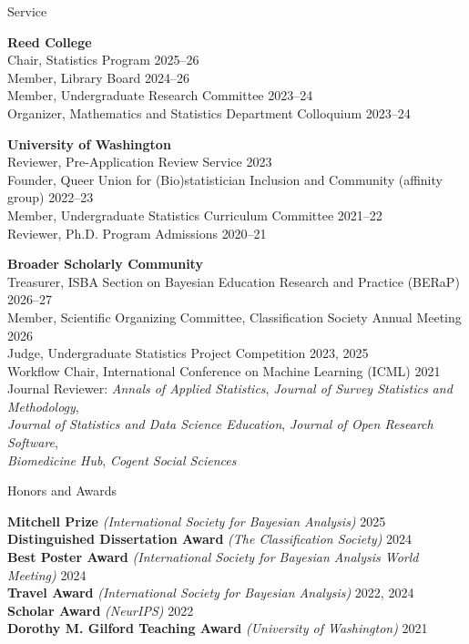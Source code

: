 \documentclass{resume} %
\begin{document}
\begin{rSection}{Service}

\textbf{Reed College}
\\ Chair, Statistics Program \hfill{2025--26}
\\ Member, Library Board \hfill{2024--26}
\\ Member, Undergraduate Research Committee \hfill{2023--24}
\\ Organizer, Mathematics and Statistics Department Colloquium \hfill{2023--24}

\textbf{University of Washington}
\\ Reviewer, Pre-Application Review Service \hfill{2023}
\\ Founder, Queer Union for (Bio)statistician Inclusion and Community (affinity group) \hfill{2022--23}
\\ Member, Undergraduate Statistics Curriculum Committee \hfill{2021--22}
\\ Reviewer, Ph.D. Program Admissions \hfill{2020--21}

\textbf{Broader Scholarly Community}
\\ Treasurer, ISBA Section on Bayesian Education Research and Practice (BERaP) \hfill{2026--27}
\\ Member, Scientific Organizing Committee, Classification Society Annual Meeting \hfill{2026}
\\ Judge, Undergraduate Statistics Project Competition \hfill{2023, 2025}
\\ Workflow Chair, International Conference on Machine Learning (ICML) \hfill{2021}
\\ Journal Reviewer: \textit{Annals of Applied Statistics}, \textit{Journal of Survey Statistics and Methodology},
\\ \hspace*{.5cm} \textit{Journal of Statistics and Data Science Education}, \textit{Journal of Open Research Software},
\\ \hspace*{.5cm} \textit{Biomedicine Hub}, \textit{Cogent Social Sciences}

\end{rSection}


\begin{rSection}{Honors and Awards}

\textbf{Mitchell Prize} \textit{(International Society for Bayesian Analysis)} \hfill{2025}
\\ \textbf{Distinguished Dissertation Award} \textit{(The Classification Society)} \hfill {2024}
\\ \textbf{Best Poster Award} \textit{(International Society for Bayesian Analysis World Meeting)} \hfill {2024}
\\ \textbf{Travel Award} \textit{(International Society for Bayesian Analysis)} \hfill {2022, 2024}
\\ \textbf{Scholar Award} \textit{(NeurIPS)} \hfill {2022}
\\ \textbf{Dorothy M. Gilford Teaching Award} \textit{(University of Washington)} \hfill {2021}

\end{rSection}
\end{document}
